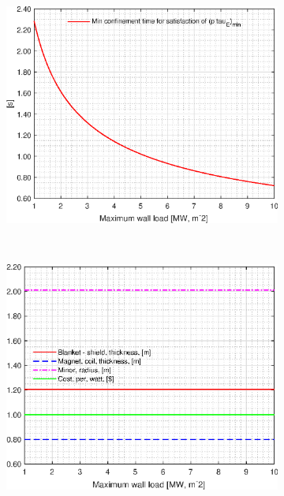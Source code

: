 \begin{figure}[H]
	\centering
	\begin{subfigure}[b]{.45\textwidth}
		\includegraphics[width=\textwidth]{MatlabFigures/PW/f1.eps}
	\end{subfigure}
	~
	\begin{subfigure}[b]{.45\textwidth}
		\includegraphics[width=\textwidth]{MatlabFigures/PW/f2.eps}
	\end{subfigure}


\end{figure}
